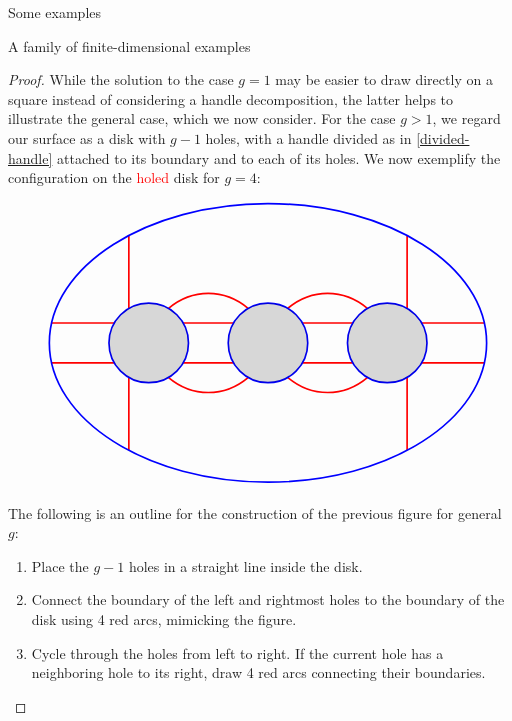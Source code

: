 \begin{chapter}{Some examples}
\begin{section}{A family of finite-dimensional examples}
\begin{proof}
While the solution to the case $g=1$ may be easier to draw directly on a square instead of considering a handle decomposition, the latter helps to illustrate the general case, which we now consider. For the case $g>1$, we regard our surface as a disk with $g-1$ holes, with a handle divided as in \ref{divided-handle} attached to its boundary and to each of its holes. We now exemplify the configuration on the \textcolor{red}{holed} disk for $g=4$:

\begin{figure}[h]
\[
\begin{tikzpicture}
\draw[red, very thick] (-5.44, 0.5) -- (-3.87, 0.5);
\draw[red, very thick] (-5.44, -0.5) -- (-3.87, -0.5);
\draw[red, very thick] (5.44, 0.5) -- (3.87, 0.5);
\draw[red, very thick] (5.44, -0.5) -- (3.87, -0.5);

\draw[red, very thick] (-3.5,0.87) -- (-3.5,2.7);
\draw[red, very thick] (-3.5,-0.87) -- (-3.5,-2.7);
\draw[red, very thick] (3.5,0.87) -- (3.5,2.7);
\draw[red, very thick] (3.5,-0.87) -- (3.5,-2.7);

\draw[red, very thick] (-2.137, 0.5) -- (-0.863, 0.5);
\draw[red, very thick] (-2.137, -0.5) -- (-0.863, -0.5);
\draw[red, very thick] (2.137, 0.5) -- (0.863, 0.5);
\draw[red, very thick] (2.137, -0.5) -- (0.863, -0.5);

\draw[red, very thick] (-2.5,0.87) to [bend left=40] (-0.5,0.87);
\draw[red, very thick] (2.5,0.87) to [bend right=40] (0.5,0.87);
\draw[red, very thick] (-2.5,-0.87) to [bend right=40] (-0.5,-0.87);
\draw[red, very thick] (2.5,-0.87) to [bend left=40] (0.5,-0.87);

\draw[blue, very thick] (0,0) ellipse (5.5cm and 3.5cm);
\draw[blue, very thick] (0,0) circle (1cm);
\draw[blue, very thick] (-3,0) circle (1cm);
\draw[blue, very thick] (3,0) circle (1cm);
\fill [black,opacity=.15] (-3,0) circle (1cm);
\fill [black,opacity=.15] (0,0) circle (1cm);
\fill [black,opacity=.15] (3,0) circle (1cm);
\end{tikzpicture}
\]
\end{figure}

The following is an outline for the construction of the previous figure for general $g$:
\begin{enumerate}
\item Place the $g-1$ holes in a straight line inside the disk.
\item Connect the boundary of the left and rightmost holes to the boundary of the disk using 4 red arcs, mimicking the figure.
\item Cycle through the holes from left to right. If the current hole has a neighboring hole to its right, draw 4 red arcs connecting their boundaries.
\end{enumerate}


\end{proof}
\end{section}
\end{chapter}
